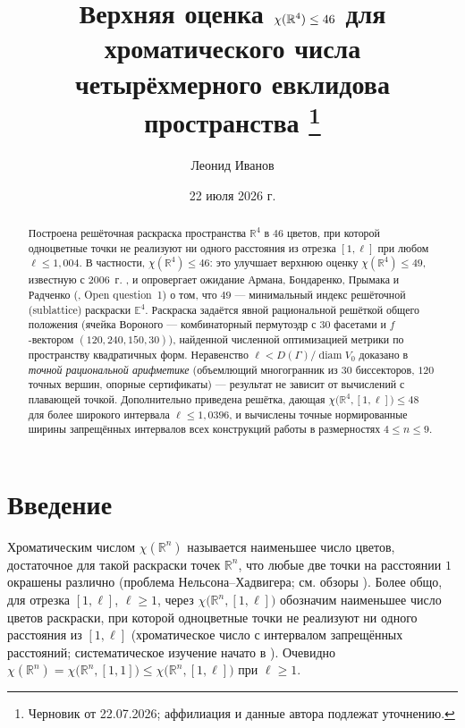\documentclass[12pt]{article}
\title{Верхняя оценка $\chi(\R^4)\le 46$ для хроматического числа
четырёхмерного евклидова пространства%
\thanks{Черновик от 22.07.2026; аффилиация и данные автора подлежат уточнению.}}
\author{Леонид Иванов}
\date{22 июля 2026 г.}
\theoremstyle{definition}
\theoremstyle{remark}
\newcommand{\R}{\mathbb{R}}
\newcommand{\E}{\mathbb{E}}
\newcommand{\diam}{\operatorname{diam}}
\begin{document}
\maketitle

\begin{abstract}
Построена решёточная раскраска пространства $\R^4$ в $46$ цветов, при которой
одноцветные точки не реализуют ни одного расстояния из отрезка $[1,\ell]$ при
любом $\ell\le 1{,}004$. В частности, $\chi(\R^4)\le 46$: это улучшает верхнюю
оценку $\chi(\R^4)\le 49$, известную с 2006~г.
\cite{Ivanov2006,CoulsonPayne2007,ABPR}, и опровергает ожидание Армана,
Бондаренко, Прымака и Радченко (\cite{ABPR}, Open question~1) о том, что $49$
--- минимальный индекс решёточной (sublattice) раскраски $\E^4$. Раскраска
задаётся явной рациональной решёткой общего положения (ячейка Вороного ---
комбинаторный пермутоэдр с $30$ фасетами и $f$-вектором $(120,240,150,30)$),
найденной численной оптимизацией метрики по пространству квадратичных форм.
Неравенство $\ell<D(\Gamma)/\diam V_0$ доказано в \emph{точной рациональной
арифметике} (объемлющий многогранник из $30$ биссекторов, $120$ точных вершин,
опорные сертификаты) --- результат не зависит от вычислений с плавающей точкой.
Дополнительно приведена решётка, дающая $\chi\bigl(\R^4,[1,\ell]\bigr)\le48$
для более широкого интервала $\ell\le1{,}0396$, и вычислены точные нормированные
ширины запрещённых интервалов всех конструкций работы \cite{ABPR} в
размерностях $4\le n\le 9$.
\end{abstract}

\section{Введение}

Хроматическим числом $\chi(\R^n)$ называется наименьшее число цветов,
достаточное для такой раскраски точек $\R^n$, что любые две точки на расстоянии
$1$ окрашены различно (проблема Нельсона--Хадвигера; см. обзоры
\cite{Raigorodskii2000,Soifer}). Более общо, для отрезка $[1,\ell]$,
$\ell\ge 1$, через $\chi\bigl(\R^n,[1,\ell]\bigr)$ обозначим наименьшее число
цветов раскраски, при которой одноцветные точки не реализуют ни одного
расстояния из $[1,\ell]$ (хроматическое число с интервалом запрещённых
расстояний; систематическое изучение начато в \cite{Ivanov2011}). Очевидно
$\chi(\R^n)=\chi\bigl(\R^n,[1,1]\bigr)\le\chi\bigl(\R^n,[1,\ell]\bigr)$ при
$\ell\ge1$.
\end{document}
